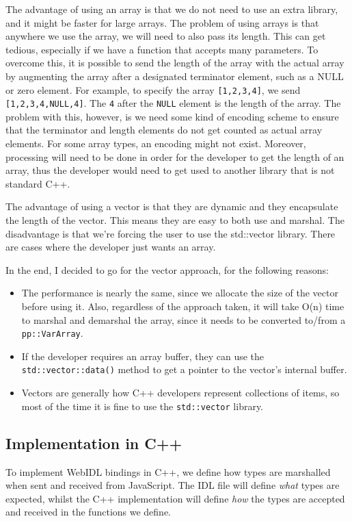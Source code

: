 The advantage of using an array is that we do not need to use an extra library, and it might be faster for large arrays. The problem of using arrays is that anywhere we use the array, we will need to also pass its length. This can get tedious, especially if we have a function that accepts many parameters. To overcome this, it is possible to send the length of the array with the actual array by augmenting the array after a designated terminator element, such as a NULL or zero element. For example, to specify the array \lstinline{[1,2,3,4]}, we send \lstinline{[1,2,3,4,NULL,4]}. The \lstinline{4} after the \lstinline{NULL} element is the length of the array. The problem with this, however, is we need some kind of encoding scheme to ensure that the terminator and length elements do not get counted as actual array elements. For some array types, an encoding might not exist. Moreover, processing will need to be done in order for the developer to get the length of an array, thus the developer would need to get used to another library that is not standard C++.

The advantage of using a vector is that they are dynamic and they encapsulate the length of the vector. This means they are easy to both use and marshal. The disadvantage is that we're forcing the user to use the std::vector library. There are cases where the developer just wants an array.

In the end, I decided to go for the vector approach, for the following reasons:

\begin{itemize}
	\item The performance is nearly the same, since we allocate the size of the vector before using it. Also, regardless of the approach taken, it will take O(n) time to marshal and demarshal the array, since it needs to be converted to/from a \lstinline{pp::VarArray}.
	\item If the developer requires an array buffer, they can use the \lstinline{std::vector::data()} method to get a pointer to the vector's internal buffer.
	\item Vectors are generally how C++ developers represent collections of items, so most of the time it is fine to use the \lstinline{std::vector} library.
\end{itemize}


\subsection{Implementation in C++} %
\label{sub:webidl_implementation_in_cpp_}
To implement WebIDL bindings in C++, we define how types are marshalled when sent and received from JavaScript. The IDL file will define \emph{what} types are expected, whilst the C++ implementation will define \emph{how} the types are accepted and received in the functions we define.

